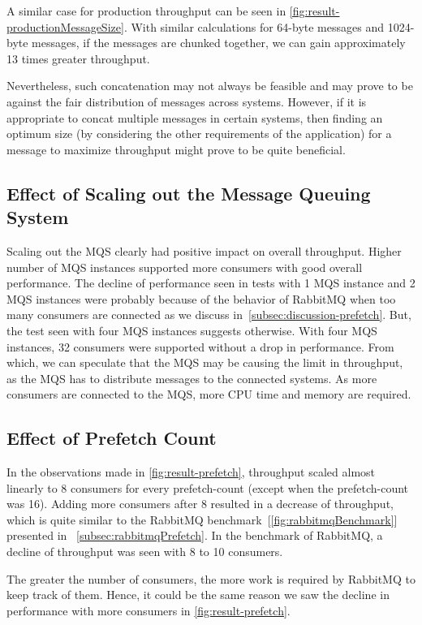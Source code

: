   A similar case for production throughput can be seen in \autoref{fig:result-productionMessageSize}. With similar calculations for 64-byte messages and 1024-byte messages, if the messages are chunked together, we can gain approximately 13 times greater throughput.

  Nevertheless, such concatenation may not always be feasible and may prove to be against the fair distribution of messages across systems. However, if it is appropriate to concat multiple messages in certain systems, then finding an optimum size (by considering the other requirements of the application) for a message to maximize throughput might prove to be quite beneficial.

\subsection{Effect of Scaling out the Message Queuing System}
  Scaling out the MQS clearly had positive impact on overall throughput. Higher number of MQS instances supported more consumers with good overall performance. The decline of performance seen in tests with 1 MQS instance and 2 MQS instances were probably because of the behavior of RabbitMQ when too many consumers are connected as we discuss in~\autoref{subsec:discussion-prefetch}. But, the test seen with four MQS instances suggests otherwise. With four MQS instances, 32 consumers were supported without a drop in performance. From which, we can speculate that the MQS may be causing the limit in throughput, as the MQS has to distribute messages to the connected systems. As more consumers are connected to the MQS, more CPU time and memory are required.


\subsection{Effect of Prefetch Count}
\label{subsec:discussion-prefetch}
  In the observations made in \autoref{fig:result-prefetch}, throughput scaled almost linearly to 8 consumers for every prefetch-count (except when the prefetch-count was 16). Adding more consumers after 8 resulted in a decrease of throughput, which is quite similar to the RabbitMQ benchmark~[\autoref{fig:rabbitmqBenchmark}] presented in ~\autoref{subsec:rabbitmqPrefetch}. In the benchmark of RabbitMQ, a decline of throughput was seen with 8 to 10 consumers.

  The greater the number of consumers, the more work is required by RabbitMQ to keep track of them. Hence, it could be the same reason we saw the decline in performance with more consumers in \autoref{fig:result-prefetch}.

